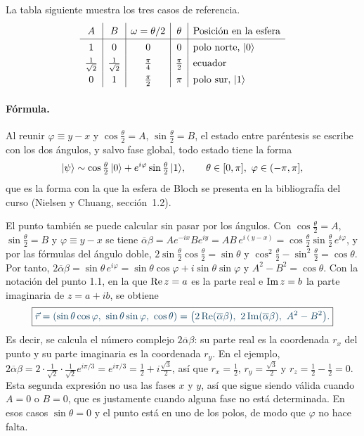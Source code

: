 La tabla siguiente muestra los tres casos de referencia.
\[
\renewcommand{\arraystretch}{1.35}
\begin{array}{c|c|c|c|l}
A & B & \omega=\theta/2 & \theta & \text{Posición en la esfera}\\ \hline
1 & 0 & 0 & 0 & \text{polo norte, } \ket0\\
\frac1{\sqrt2} & \frac1{\sqrt2} & \frac\pi4 & \frac\pi2 & \text{ecuador}\\
0 & 1 & \frac\pi2 & \pi & \text{polo sur, } \ket1
\end{array}
\]

\paragraph{Fórmula.}
Al reunir $\varphi\equiv y-x$ y $\cos\frac\theta2=A$, $\sin\frac\theta2=B$, el estado entre
paréntesis se escribe con los dos ángulos, y salvo fase global, todo estado tiene la forma
\begin{equation}\label{eq:forma-bloch}
  \lvert \psi\rangle\sim\cos\tfrac\theta2\,\lvert 0\rangle+e^{i\varphi}\sin\tfrac\theta2\,\lvert 1\rangle,
  \qquad \theta\in[0,\pi],\ \varphi\in(-\pi,\pi] ,
\end{equation}
que es la forma con la que la esfera de Bloch se presenta en la bibliografía del curso (Nielsen
y Chuang, sección~1.2).

El punto también se puede calcular sin pasar por los ángulos. Con $\cos\frac\theta2=A$,
$\sin\frac\theta2=B$ y $\varphi\equiv y-x$ se tiene
$\overline\alpha\beta=Ae^{-ix}Be^{iy}=AB\,e^{i(y-x)}=\cos\frac\theta2\sin\frac\theta2\,e^{i\varphi}$,
y por las fórmulas del ángulo doble, $2\sin\frac\theta2\cos\frac\theta2=\sin\theta$ y
$\cos^2\frac\theta2-\sin^2\frac\theta2=\cos\theta$. Por tanto,
$2\overline\alpha\beta=\sin\theta\,e^{i\varphi}=\sin\theta\cos\varphi+i\sin\theta\sin\varphi$ y
$A^2-B^2=\cos\theta$. Con la notación del punto 1.1, en la que $\operatorname{Re} z=a$ es la parte real e $\operatorname{Im} z=b$ la parte imaginaria de $z=a+ib$, se obtiene
\begin{equation}\label{eq:a-c}
  \destacado{\vec r=(\sin\theta\cos\varphi,\ \sin\theta\sin\varphi,\ \cos\theta)
  =\bigl(2\Real(\overline\alpha\beta),\ 2\Imag(\overline\alpha\beta),\ A^2-B^2\bigr).}
\end{equation}
Es decir, se calcula el número complejo $2\overline\alpha\beta$: su parte real es la coordenada $r_x$ del punto y su parte imaginaria es la coordenada $r_y$. En el ejemplo, $2\overline\alpha\beta=2\cdot\frac1{\sqrt2}\cdot\frac1{\sqrt2}e^{i\pi/3}=e^{i\pi/3}=\frac12+i\frac{\sqrt3}{2}$, así que $r_x=\frac12$, $r_y=\frac{\sqrt3}{2}$ y $r_z=\frac12-\frac12=0$.
Esta segunda expresión no usa las fases $x$ y $y$, así que sigue siendo válida cuando $A=0$ o
$B=0$, que es justamente cuando alguna fase no está determinada. En esos casos $\sin\theta=0$ y
el punto está en uno de los polos, de modo que $\varphi$ no hace falta.

